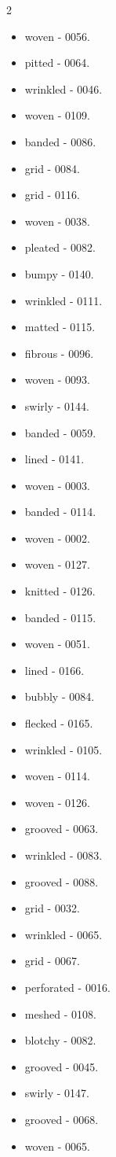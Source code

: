 \begin{multicols}{2}
\begin{itemize}
\item woven - 0056.
\item pitted - 0064.
\item wrinkled - 0046.
\item woven - 0109.
\item banded - 0086.
\item grid - 0084.
\item grid - 0116.
\item woven - 0038.
\item pleated - 0082.
\item bumpy - 0140.
\item wrinkled - 0111.
\item matted - 0115.
\item fibrous - 0096.
\item woven - 0093.
\item swirly - 0144.
\item banded - 0059.
\item lined - 0141.
\item woven - 0003.
\item banded - 0114.
\item woven - 0002.
\item woven - 0127.
\item knitted - 0126.
\item banded - 0115.
\item woven - 0051.
\item lined - 0166.
\item bubbly - 0084.
\item flecked - 0165.
\item wrinkled - 0105.
\item woven - 0114.
\item woven - 0126.
\item grooved - 0063.
\item wrinkled - 0083.
\item grooved - 0088.
\item grid - 0032.
\item wrinkled - 0065.
\item grid - 0067.
\item perforated - 0016.
\item meshed - 0108.
\item blotchy - 0082.
\item grooved - 0045.
\item swirly - 0147.
\item grooved - 0068.
\item woven - 0065.

\end{itemize}
\end{multicols}
